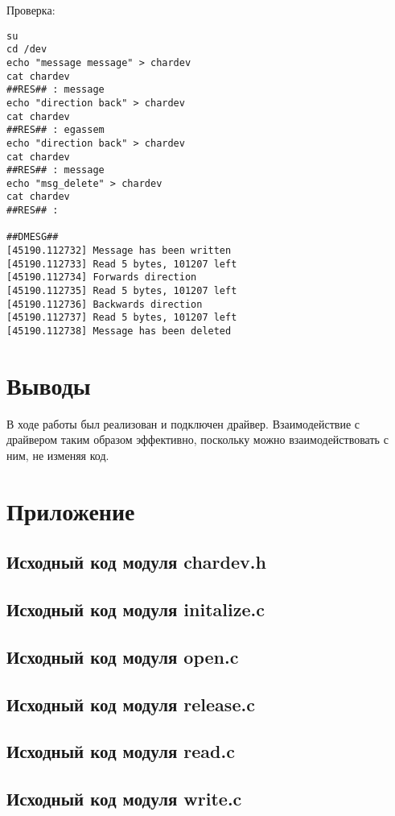 \documentclass[a4paper,11pt]{article}
\begin{document}
    Проверка:
    \begin{lstlisting}
su 
cd /dev
echo "message message" > chardev
cat chardev
##RES## : message
echo "direction back" > chardev
cat chardev
##RES## : egassem
echo "direction back" > chardev
cat chardev
##RES## : message
echo "msg_delete" > chardev
cat chardev
##RES## :

##DMESG##
[45190.112732] Message has been written
[45190.112733] Read 5 bytes, 101207 left
[45190.112734] Forwards direction
[45190.112735] Read 5 bytes, 101207 left
[45190.112736] Backwards direction
[45190.112737] Read 5 bytes, 101207 left
[45190.112738] Message has been deleted
    \end{lstlisting}

\section{Выводы}
  В ходе работы был реализован и подключен драйвер.
  Взаимодействие с драйвером таким образом эффективно, поскольку можно взаимодействовать с ним, не изменяя код.
  \newpage

\section{Приложение}
  \subsection{Исходный код модуля chardev.h}
    
  \subsection{Исходный код модуля initalize.c}
    
  \subsection{Исходный код модуля open.c}
    
  \subsection{Исходный код модуля release.c}
    
  \subsection{Исходный код модуля read.c}
    
  \subsection{Исходный код модуля write.c}
    
\end{document}
